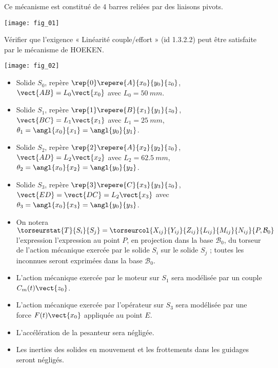 Ce mécanisme est constitué de 4 barres reliées par des liaisons pivots.

\begin{marginfigure}
\texttt{[image: fig\_01]}
\end{marginfigure}

\begin{obj}
Vérifier que l’exigence « Linéarité couple/effort » (id 1.3.2.2) peut être satisfaite
par le mécanisme de HOEKEN.
\end{obj}


\begin{marginfigure}
\texttt{[image: fig\_02]}
\end{marginfigure}

\begin{itemize}
\item Solide $S_0$, repère $\rep{0}\repere{A}{x_0}{y_0}{z_0}$, $\vect{AB}=L_0\vect{x_0}$ avec $L_0 = \SI{50}{mm}$.
\item Solide $S_1$, repère $\rep{1}\repere{B}{x_1}{y_1}{z_0}$, $\vect{BC}=L_1\vect{x_1}$ avec $L_1 = \SI{25}{mm}$, $\theta_1=\angl{x_0}{x_1}=\angl{y_0}{y_1}$.
\item Solide $S_2$, repère $\rep{2}\repere{A}{x_2}{y_2}{z_0}$, $\vect{AD}=L_2\vect{x_2}$ avec $L_2 = \SI{62,5}{mm}$, $\theta_2=\angl{x_0}{x_2}=\angl{y_0}{y_2}$.
\item Solide $S_3$, repère $\rep{3}\repere{C}{x_3}{y_3}{z_0}$, $\vect{ED}=\vect{DC}=L_2\vect{x_3}$ avec  $\theta_3=\angl{x_0}{x_3}=\angl{y_0}{y_3}$.
\end{itemize}


\begin{itemize}
\item On notera $\torseurstat{T}{S_i}{S_j}=\torseurcol{X_{ij}}{Y_{ij}}{Z_{ij}}{L_{ij}}{M_{ij}}{N_{ij}}{P,\mathcal{B}_0}$ l'expression l’expression au point $P$, en projection dans la
base $\mathcal{B}_0$, du torseur de l’action mécanique exercée par le solide $S_i$ sur le solide $S_j$ ; toutes
les inconnues seront exprimées dans la base $\mathcal{B}_0$.
\item L’action mécanique exercée par le moteur sur $S_1$ sera modélisée par un couple $C_m(t) \vect{z_0}$.
\item L’action mécanique exercée par l’opérateur sur $S_3$ sera modélisée par une force $F(t) \vect{x_0}$
appliquée au point $E$.
\item L’accélération de la pesanteur sera négligée.%
\item Les inerties des solides en mouvement et les frottements dans les guidages seront négligés.
\end{itemize}
\fi

